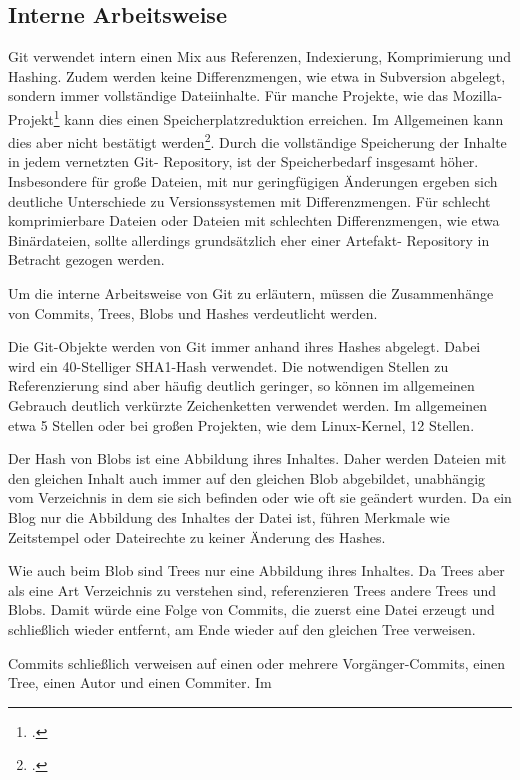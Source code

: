 \subsection{Interne Arbeitsweise}

Git verwendet intern einen Mix aus Referenzen, Indexierung, Komprimierung und Hashing. Zudem werden keine 
Differenzmengen, wie etwa in Subversion abgelegt, sondern immer vollständige Dateiinhalte. Für manche Projekte, wie das 
Mozilla-Projekt\footcite{kernel-git-svn} kann dies einen Speicherplatzreduktion erreichen. Im Allgemeinen kann dies aber 
nicht bestätigt werden\footcite{svn-vs-git}. Durch die vollständige Speicherung der Inhalte in jedem vernetzten Git-
Repository, ist der Speicherbedarf insgesamt höher. Insbesondere für große Dateien, mit nur geringfügigen Änderungen 
ergeben sich deutliche Unterschiede zu Versionssystemen mit Differenzmengen. Für schlecht komprimierbare Dateien oder 
Dateien mit schlechten Differenzmengen, wie etwa Binärdateien, sollte allerdings grundsätzlich eher einer Artefakt-
Repository in Betracht gezogen werden.

Um die interne Arbeitsweise von Git zu erläutern, müssen die Zusammenhänge von Commits, Trees, Blobs und Hashes 
verdeutlicht werden.

Die Git-Objekte werden von Git immer anhand ihres Hashes abgelegt. Dabei wird ein 40-Stelliger SHA1-Hash verwendet. Die 
notwendigen Stellen zu Referenzierung sind aber häufig deutlich geringer, so können im allgemeinen Gebrauch deutlich 
verkürzte Zeichenketten verwendet werden. Im allgemeinen etwa 5 Stellen oder bei großen Projekten, wie dem Linux-Kernel, 
12 Stellen.

Der Hash von Blobs ist eine Abbildung ihres Inhaltes. Daher werden Dateien mit den gleichen Inhalt auch immer auf den 
gleichen Blob abgebildet, unabhängig vom Verzeichnis in dem sie sich befinden oder wie oft sie geändert wurden. Da ein 
Blog nur die Abbildung des Inhaltes der Datei ist, führen Merkmale wie Zeitstempel oder Dateirechte zu keiner Änderung 
des Hashes.

Wie auch beim Blob sind Trees nur eine Abbildung ihres Inhaltes. Da Trees aber als eine Art Verzeichnis zu verstehen 
sind, referenzieren Trees andere Trees und Blobs. Damit würde eine Folge von Commits, die zuerst eine Datei erzeugt und 
schließlich wieder entfernt, am Ende wieder auf den gleichen Tree verweisen.

Commits schließlich verweisen auf einen oder mehrere Vorgänger-Commits, einen Tree, einen Autor und einen Commiter. Im 

